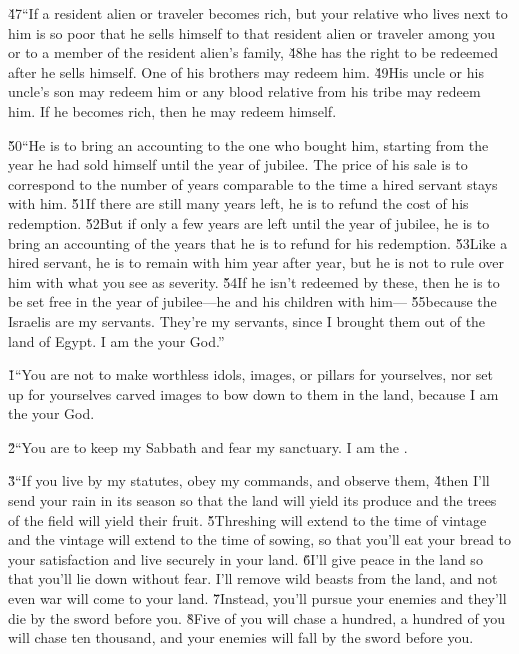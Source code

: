 \v{47}``If a resident alien or traveler becomes rich, but your relative who lives next to him is so poor that he sells himself to that resident alien or traveler among you or to a member of the resident alien's family, \v{48}he has the right to be redeemed after he sells himself. One of his brothers may redeem him. \v{49}His uncle or his uncle's son may redeem him or any blood relative from his tribe may redeem him. If he becomes rich, then he may redeem himself.

\v{50}``He is to bring an accounting to the one who bought him, starting from the year he had sold himself until the year of jubilee. The price of his sale is to correspond to the number of years comparable to the time a hired servant stays with him. \v{51}If there are still many years left, he is to refund the cost of his redemption. \v{52}But if only a few years are left until the year of jubilee, he is to bring an accounting of the years that he is to refund for his redemption. \v{53}Like a hired servant, he is to remain with him year after year, but he is not to rule over him with what you see as severity. \v{54}If he isn't redeemed by these, then he is to be set free in the year of jubilee---he and his children with him--- \v{55}because the Israelis are my servants. They're my servants, since I brought them out of the land of Egypt. I am the  your God.''

\v{1}``You are not to make worthless idols, images, or pillars for yourselves, nor set up for yourselves carved images to bow down to them in the land, because I am the  your God.

\v{2}``You are to keep my Sabbath and fear my sanctuary. I am the .

\v{3}``If you live by my statutes, obey my commands, and observe them, \v{4}then I'll send your rain in its season so that the land will yield its produce and the trees of the field will yield their fruit. \v{5}Threshing will extend to the time of vintage and the vintage will extend to the time of sowing, so that you'll eat your bread to your satisfaction and live securely in your land. \v{6}I'll give peace in the land so that you'll lie down without fear. I'll remove wild beasts from the land, and not even war will come to your land. \v{7}Instead, you'll pursue your enemies and they'll die by the sword before you. \v{8}Five of you will chase a hundred, a hundred of you will chase ten thousand, and your enemies will fall by the sword before you.

